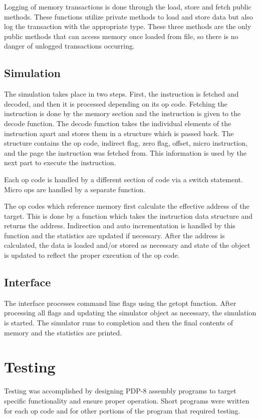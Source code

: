 \documentclass[12pt]{article}
\begin{document}
Logging of memory transactions is done through the load, store and fetch public methods. These functions utilize private methods to load and store data but also log the transaction with the appropriate type. These three methods are the only public methods that can access memory once loaded from file, so there is no danger of unlogged transactions occurring.

\subsection{Simulation}
The simulation takes place in two steps. First, the instruction is fetched and decoded, and then it is processed depending on its op code. Fetching the instruction is done by the memory section and the instruction is given to the decode function. The decode function takes the individual elements of the instruction apart and stores them in a structure which is passed back. The structure contains the op code, indirect flag, zero flag, offset, micro instruction, and the page the instruction was fetched from. This information is used by the next part to execute the instruction.

Each op code is handled by a different section of code via a switch statement. Micro ops are handled by a separate function. 

The op codes which reference memory first calculate the effective address of the target. This is done by a function which takes the instruction data structure and returns the address. Indirection and auto incrementation is handled by this function and the statistics are updated if necessary. After the address is calculated, the data is loaded and/or stored as necessary and state of the object is updated to reflect the proper execution of the op code. 

\subsection{Interface}
The interface processes command line flags using the getopt function. After processing all flags and updating the simulator object as necessary, the simulation is started. The simulator runs to completion and then the final contents of memory and the statistics are printed.

\section{Testing}
Testing was accomplished by designing PDP-8 assembly programs to target specific functionality and ensure proper operation. Short programs were written for each op code and for other portions of the program that required testing.
\end{document}
